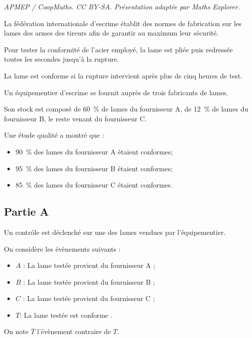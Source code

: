 \documentclass[10pt]{article}
\begin{document}
\noindent\textit{APMEP / CoopMaths. CC BY-SA. Présentation adaptée par Maths Explorer.}\par\medskip
La fédération internationale d'escrime établit des normes de fabrication sur les lames des armes des tireurs afin de garantir au maximum leur sécurité.
	
	
	Pour tester la conformité de l'acier employé, la lame est pliée puis redressée toutes les secondes jusqu'à la rupture.
	
	La lame est conforme si la rupture intervient après plus de cinq heures de test.
	
	\medskip
	
	Un équipementier d'escrime se fournit auprès de trois fabricants de lames.
	
	Son stock est composé de 60~\% de lames du fournisseur A, de 12~\% de lames du fournisseur B, le reste venant du fournisseur C.
	
	\medskip
	
	Une étude qualité a montré que :
	\begin{itemize}[label={\textbullet~}]
		\item 90~\% des lames du fournisseur A étaient conformes;
		\item 95~\% des lames du fournisseur B étaient conformes;
		\item 85~\% des lames du fournisseur C étaient conformes.
	\end{itemize}
	
	\subsection*{Partie A}
	Un contrôle est déclenché sur une des lames vendues par l'équipementier.
	
	\medskip
	
	On considère les évènements suivants :
	\begin{itemize}[label={\textbullet~}]
		\item $A$ : \og La lame testée provient du fournisseur A \fg{};
		\item $B$ : \og La lame testée provient du fournisseur B \fg{};
		\item $C$ : \og La lame testée provient du fournisseur C \fg{};
		\item $T$: \og La lame testée est conforme \fg{}.
	\end{itemize}
	
	On note $\overline{T}$ l'évènement contraire de $T$.
	
\end{document}
